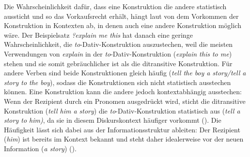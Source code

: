 Die Wahrscheinlichkeit dafür, dass eine Konstruktion die andere statistisch aussticht und so das Vorkaufsrecht erhält, hängt laut \textcite[85]{Goldberg.2019} von dem Vorkommen der Konstruktion in Kontexten ab, in denen auch eine andere Konstruktion möglich wäre. Der Beispielsatz \textit{?explain me this} hat danach eine geringe Wahrscheinlichkeit, die \textit{to}-Dativ-Konstruktion auszustechen, weil die meisten Verwendungen von \textit{explain} in der \textit{to}-Dativ-Konstruktion (\textit{explain this to me}) stehen und sie somit gebräuchlicher ist als die ditransitive Konstruktion. Für andere Verben sind beide Konstruktionen gleich häufig (\textit{tell the boy a story/tell a story to the boy}), sodass die Konstruktionen sich nicht statistisch ausstechen können. Eine Konstruktion kann die andere jedoch kontextabhängig ausstechen: Wenn der Rezipient durch ein Pronomen ausgedrückt wird, sticht die ditransitive Konstruktion (\textit{tell him a story}) die \textit{to}-Dativ-Konstruktion statistisch aus (\textit{tell a story to him)}, da sie in diesem Diskurskontext  häufiger vorkommt (\cite[86]{Goldberg.2019}). Die Häufigkeit lässt sich dabei aus der Informationsstruktur ableiten: Der Rezipient (\textit{him}) ist bereits im Kontext bekannt und steht daher idealerweise vor der neuen Information (\textit{a story}) (\cite[42--43]{Goldberg.2019}).

